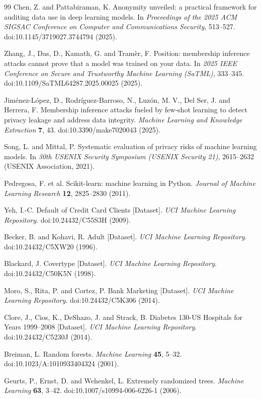 \documentclass[
  10pt,
  twocolumn]{article}
\begin{document}
\begin{thebibliography}{99}
Chen, Z. and Pattabiraman, K.
Anonymity unveiled: a practical framework for auditing data use in deep learning models.
In \emph{Proceedings of the 2025 ACM SIGSAC Conference on Computer and Communications Security}, 513--527.
doi:10.1145/3719027.3744794 (2025).

Zhang, J., Das, D., Kamath, G. and Tram{\`e}r, F.
Position: membership inference attacks cannot prove that a model was trained on your data.
In \emph{2025 IEEE Conference on Secure and Trustworthy Machine Learning (SaTML)}, 333--345.
doi:10.1109/SaTML64287.2025.00025 (2025).

Jim{\'e}nez-L{\'o}pez, D., Rodr{\'i}guez-Barroso, N., Luz{\'o}n, M. V., Del Ser, J. and Herrera, F.
Membership inference attacks fueled by few-shot learning to detect privacy leakage and address data integrity.
\emph{Machine Learning and Knowledge Extraction} \textbf{7}, 43.
doi:10.3390/make7020043 (2025).

Song, L. and Mittal, P.
Systematic evaluation of privacy risks of machine learning models.
In \emph{30th USENIX Security Symposium (USENIX Security 21)}, 2615--2632 (USENIX Association, 2021).

Pedregosa, F. et al.
Scikit-learn: machine learning in Python.
\emph{Journal of Machine Learning Research} \textbf{12}, 2825--2830 (2011).

Yeh, I.-C.
Default of Credit Card Clients [Dataset].
\emph{UCI Machine Learning Repository}.
doi:10.24432/C55S3H (2009).

Becker, B. and Kohavi, R.
Adult [Dataset].
\emph{UCI Machine Learning Repository}.
doi:10.24432/C5XW20 (1996).

Blackard, J.
Covertype [Dataset].
\emph{UCI Machine Learning Repository}.
doi:10.24432/C50K5N (1998).

Moro, S., Rita, P. and Cortez, P.
Bank Marketing [Dataset].
\emph{UCI Machine Learning Repository}.
doi:10.24432/C5K306 (2014).

Clore, J., Cios, K., DeShazo, J. and Strack, B.
Diabetes 130-US Hospitals for Years 1999--2008 [Dataset].
\emph{UCI Machine Learning Repository}.
doi:10.24432/C5230J (2014).

Breiman, L.
Random forests.
\emph{Machine Learning} \textbf{45}, 5--32.
doi:10.1023/A:1010933404324 (2001).

Geurts, P., Ernst, D. and Wehenkel, L.
Extremely randomized trees.
\emph{Machine Learning} \textbf{63}, 3--42.
doi:10.1007/s10994-006-6226-1 (2006).


\end{thebibliography}
\end{document}

